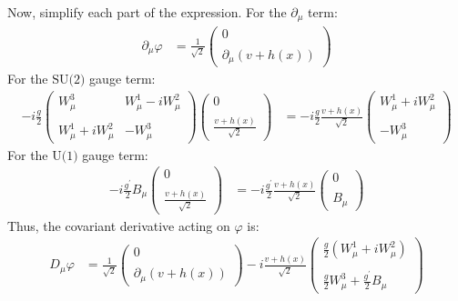 Now, simplify each part of the expression. For the $\partial_\mu$ term:
\begin{align}
    \partial_\mu \varphi &= \frac{1}{\sqrt{2}} \begin{pmatrix} 0 \\\\ \partial_\mu (v + h(x)) \end{pmatrix}
\end{align}
For the $\text{SU(2)}$ gauge term:
\begin{align}
    - i \frac{g}{2} \begin{pmatrix} W_\mu^3 & W_\mu^1 - i W_\mu^2 \\\\ W_\mu^1 + i W_\mu^2 & -W_\mu^3 \end{pmatrix} \begin{pmatrix} 0 \\\\ \displaystyle\frac{v + h(x)}{\sqrt{2}} \end{pmatrix} &= - i \frac{g}{2} \frac{v + h(x)}{\sqrt{2}} \begin{pmatrix} W_\mu^1 + i W_\mu^2 \\\\ -W_\mu^3 \end{pmatrix}
\end{align}
For the $\text{U(1)}$ gauge term:
\begin{align}
    - i \frac{g^\prime }{2} B_\mu \begin{pmatrix} 0 \\\\ \displaystyle\frac{v + h(x)}{\sqrt{2}} \end{pmatrix} &= - i \frac{g^\prime }{2} \frac{v + h(x)}{\sqrt{2}} \begin{pmatrix} 0 \\\\ B_\mu \end{pmatrix}
\end{align}
Thus, the covariant derivative acting on $\varphi$ is:
\begin{align}
    D_\mu \varphi &= \frac{1}{\sqrt{2}} \begin{pmatrix} 0 \\ \\ \displaystyle\partial_\mu (v + h(x)) \end{pmatrix} - i \frac{v + h(x)}{\sqrt{2}} \begin{pmatrix} \displaystyle\frac{g}{2} (W_\mu^1 + i W_\mu^2) \\ \\ \displaystyle\frac{g}{2} W_\mu^3 + \frac{g^\prime }{2} B_\mu \end{pmatrix}
\end{align}
